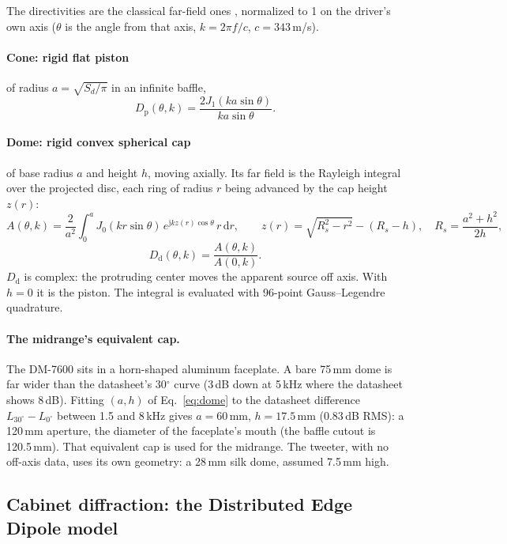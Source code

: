 \documentclass[11pt,a4paper]{article}
\newcommand{\dd}{\,\mathrm{d}}
\newcommand{\jj}{\mathrm{j}}
\begin{document}
The directivities are the classical far-field ones \cite{beranek}, normalized to 1 on the driver's
own axis ($\theta$ is the angle from that axis, $k=2\pi f/c$, $c=343$\,m/s).

\paragraph{Cone: rigid flat piston} of radius $a=\sqrt{S_d/\pi}$ in an infinite baffle,
\begin{equation}
  D_\text{p}(\theta,k)=\frac{2J_1(ka\sin\theta)}{ka\sin\theta}.
\end{equation}

\paragraph{Dome: rigid convex spherical cap} of base radius $a$ and height $h$, moving axially. Its
far field is the Rayleigh integral over the projected disc, each ring of radius $r$ being advanced
by the cap height $z(r)$:
\begin{equation}
  A(\theta,k)=\frac{2}{a^2}\int_0^a J_0(kr\sin\theta)\,e^{\jj kz(r)\cos\theta}\,r\dd r,\qquad
  z(r)=\sqrt{R_s^2-r^2}-(R_s-h),\quad R_s=\frac{a^2+h^2}{2h},
  \label{eq:dome}
\end{equation}
\begin{equation}
  D_\text{d}(\theta,k)=\frac{A(\theta,k)}{A(0,k)}.
\end{equation}
$D_\text{d}$ is complex: the protruding center moves the apparent source off axis. With $h=0$ it is
the piston. The integral is evaluated with 96-point Gauss--Legendre quadrature.

\paragraph{The midrange's equivalent cap.} The DM-7600 sits in a horn-shaped aluminum faceplate.
A bare 75\,mm dome is far wider than the datasheet's 30$^\circ$ curve (3\,dB down at 5\,kHz where the
datasheet shows 8\,dB). Fitting $(a,h)$ of Eq.~\eqref{eq:dome} to the datasheet difference
$L_{30^\circ}-L_{0^\circ}$ between 1.5 and 8\,kHz gives $a=60$\,mm, $h=17.5$\,mm (0.83\,dB RMS):
a 120\,mm aperture, the diameter of the faceplate's mouth (the baffle cutout is 120.5\,mm). That
equivalent cap is used for the midrange. The tweeter, with no off-axis data, uses its own
geometry: a 28\,mm silk dome, assumed 7.5\,mm high.

\subsection{Cabinet diffraction: the Distributed Edge Dipole model}
\end{document}
